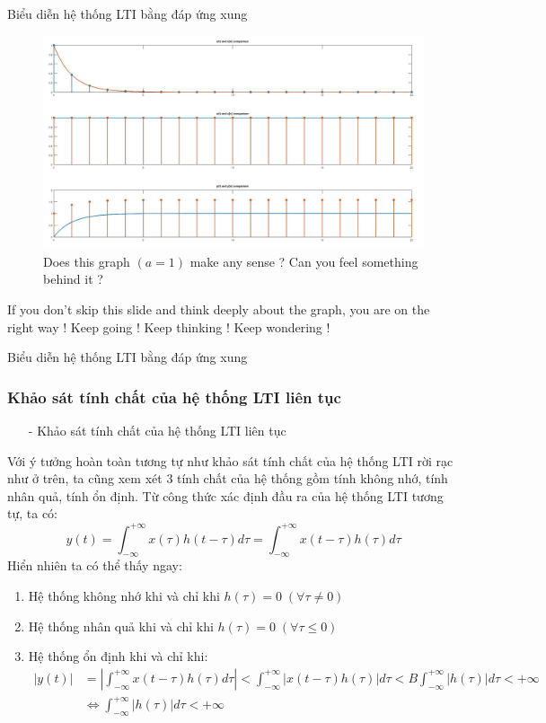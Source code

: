 \documentclass[8pt]{beamer}
\begin{document}
\begin{frame}{Biểu diễn hệ thống LTI bằng đáp ứng xung}
\begin{figure}[h]
			\includegraphics[width=1\textwidth]{test.jpg}
			\caption{Does this graph $(a=1)$ make any sense ? Can you feel something behind it ?}\label{fig:re10}
		\end{figure}
If you don't skip this slide and think deeply about the graph, you are on the right way ! Keep going ! Keep thinking ! Keep wondering !
\end{frame}
\begin{frame}{Biểu diễn hệ thống LTI bằng đáp ứng xung}
\subsubsection{Khảo sát tính chất của hệ thống LTI liên tục}
\begin{itemize}
	\item[-] Khảo sát tính chất của hệ thống LTI liên tục
\end{itemize}
	Với ý tưởng hoàn toàn tương tự như khảo sát tính chất của hệ thống LTI rời rạc như ở trên, ta cũng xem xét $3$ tính chất của hệ thống gồm \alert{tính không nhớ}, \alert{tính nhân quả}, \alert{tính ổn định}. Từ công thức xác định đầu ra của hệ thống LTI tương tự, ta có:
	$$y(t)=\int_{-\infty}^{+\infty}x(\tau)h(t-\tau)d\tau=\int_{-\infty}^{+\infty}x(t-\tau)h(\tau)d\tau$$
Hiển nhiên ta có thể thấy ngay:
\begin{enumerate}
	\item Hệ thống không nhớ khi và chỉ khi $h(\tau)=0\;(\forall \tau\neq 0)$
	\item Hệ thống nhân quả khi và chỉ khi $h(\tau)=0\;(\forall \tau\leq0)$
	\item Hệ thống ổn định khi và chỉ khi:
\begin{equation*}
\begin{split}
	|y(t)|&=\left|\int_{-\infty}^{+\infty}x(t-\tau)h(\tau)d\tau\right|<\int_{-\infty}^{+\infty}|x(t-\tau)h(\tau)|d\tau<B\int_{-\infty}^{+\infty}|h(\tau)|d\tau<+\infty\\
&\Leftrightarrow \int_{-\infty}^{+\infty}|h(\tau)|d\tau<+\infty
\end{split}
\end{equation*}
\end{enumerate}
\end{frame}
\end{document}
